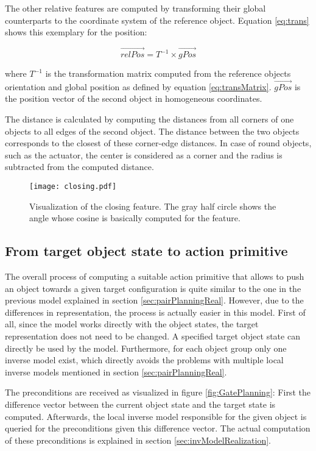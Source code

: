 The other relative features are computed by transforming their global counterparts to the coordinate system of the reference object. Equation \ref{eq:trans} shows this exemplary for the position:

\begin{equation}
	\vec{relPos} = T^{-1} \times \vec{gPos}
\label{eq:trans}
\end{equation}

where $T^{-1}$ is the transformation matrix computed from the reference objects orientation and global position as defined by equation \ref{eq:transMatrix}. $\vec{gPos}$ is the position vector of the second object in homogeneous coordinates. 

The distance is calculated by computing the distances from all corners of one objects to all edges of the second object. 
The distance between the two objects corresponds to the closest of these corner-edge distances. In case of round objects, such as the actuator, the center is considered as a corner and the radius is subtracted from the computed distance.

\begin{figure}
	\centering
	\texttt{[image: closing.pdf]}
	\caption{Visualization of the closing feature. The gray half circle shows the angle whose cosine is basically computed for the feature.} 
	\label{fig:closing}
\end{figure} 

\subsection{From target object state to action primitive \label{sec:gatePlanningReal}}

The overall process of computing a suitable action primitive that allows to push an object towards a given target configuration is quite similar to the one in the previous model explained in section \ref{sec:pairPlanningReal}. However, due to the differences in representation, the process is actually easier in this model. 
First of all, since the model works directly with the object states, the target representation does not need to be changed. A specified target object state can directly be used by the model. 
Furthermore, for each object group only one inverse model exist, which directly avoids the problems with multiple local inverse models mentioned in section \ref{sec:pairPlanningReal}. 

The preconditions are received as visualized in figure \ref{fig:GatePlanning}: 
First the difference vector between the current object state and the target state is computed. Afterwards, the local inverse model responsible for the given object is queried for the preconditions given this difference vector. The actual computation of these preconditions is explained in section \ref{sec:invModelRealization}.

